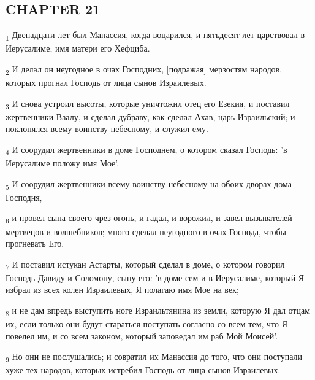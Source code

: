 \subsection{CHAPTER 21}
\begin{tcolorbox}
\textsubscript{1} Двенадцати лет был Манассия, когда воцарился, и пятьдесят лет царствовал в Иерусалиме; имя матери его Хефциба.
\end{tcolorbox}
\begin{tcolorbox}
\textsubscript{2} И делал он неугодное в очах Господних, [подражая] мерзостям народов, которых прогнал Господь от лица сынов Израилевых.
\end{tcolorbox}
\begin{tcolorbox}
\textsubscript{3} И снова устроил высоты, которые уничтожил отец его Езекия, и поставил жертвенники Ваалу, и сделал дубраву, как сделал Ахав, царь Израильский; и поклонялся всему воинству небесному, и служил ему.
\end{tcolorbox}
\begin{tcolorbox}
\textsubscript{4} И соорудил жертвенники в доме Господнем, о котором сказал Господь: 'в Иерусалиме положу имя Мое'.
\end{tcolorbox}
\begin{tcolorbox}
\textsubscript{5} И соорудил жертвенники всему воинству небесному на обоих дворах дома Господня,
\end{tcolorbox}
\begin{tcolorbox}
\textsubscript{6} и провел сына своего чрез огонь, и гадал, и ворожил, и завел вызывателей мертвецов и волшебников; много сделал неугодного в очах Господа, чтобы прогневать Его.
\end{tcolorbox}
\begin{tcolorbox}
\textsubscript{7} И поставил истукан Астарты, который сделал в доме, о котором говорил Господь Давиду и Соломону, сыну его: 'в доме сем и в Иерусалиме, который Я избрал из всех колен Израилевых, Я полагаю имя Мое на век;
\end{tcolorbox}
\begin{tcolorbox}
\textsubscript{8} и не дам впредь выступить ноге Израильтянина из земли, которую Я дал отцам их, если только они будут стараться поступать согласно со всем тем, что Я повелел им, и со всем законом, который заповедал им раб Мой Моисей'.
\end{tcolorbox}
\begin{tcolorbox}
\textsubscript{9} Но они не послушались; и совратил их Манассия до того, что они поступали хуже тех народов, которых истребил Господь от лица сынов Израилевых.
\end{tcolorbox}
